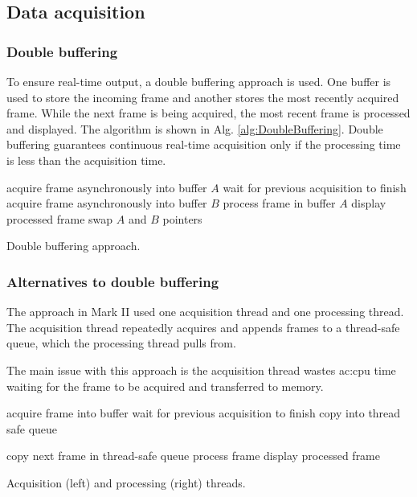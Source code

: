 \documentclass{article}
\begin{document}
\subsection{Data acquisition}
\subsubsection{Double buffering}
To ensure real-time output, a double buffering approach is used.
One buffer is used to store the incoming frame and another stores the most recently acquired frame.
While the next frame is being acquired, the most recent frame is processed and displayed. The algorithm is shown in Alg. \ref{alg:DoubleBuffering}. Double buffering guarantees continuous real-time acquisition only if the processing time is less than the acquisition time.

\begin{algorithm}
	\centering
	\begin{algorithmic}
		\State acquire frame asynchronously into buffer $A$
		\State wait for previous acquisition to finish
		\State acquire frame asynchronously into buffer $B$
		\State process frame in buffer $A$
		\State display processed frame
		\State swap $A$ and $B$ pointers
		\EndWhile
	\end{algorithmic}
	\caption{Double buffering approach.}\label{alg:DoubleBuffering}
\end{algorithm}

\subsubsection{Alternatives to double buffering}\label{sc:AltToDblBuf}
The approach in Mark II used one acquisition thread and one processing thread. The acquisition thread repeatedly acquires and appends frames to a thread-safe queue, which the processing thread pulls from.

The main issue with this approach is the acquisition thread wastes \acrshort{ac:cpu} time waiting for the frame to be acquired and transferred to memory.

\begin{algorithm}
	\begin{minipage}{0.48\linewidth}
		\begin{algorithmic}
			\While {keep acquiring data}
			\State acquire frame into buffer
			\State wait for previous acquisition to finish
			\State copy into thread safe queue
			\EndWhile
		\end{algorithmic}
	\end{minipage}
	\begin{minipage}{0.48\linewidth}
		\begin{algorithmic}
			\State copy next frame in thread-safe queue
			\State process frame
			\State display processed frame
			\EndWhile
		\end{algorithmic}
	\end{minipage}
	\caption{Acquisition (left) and processing (right) threads.}\label{alg:TwoThreads}
\end{algorithm}
\end{document}
